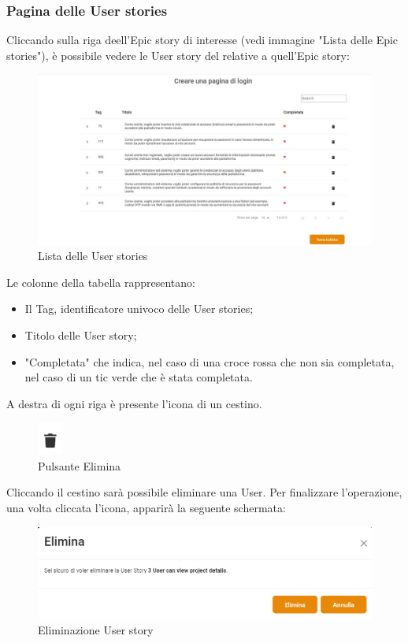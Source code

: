 \documentclass{article}
\begin{document}
\subsubsection{Pagina delle User stories}
Cliccando sulla riga deell'Epic story di interesse (vedi immagine "Lista delle Epic stories"), è possibile vedere le User story del relative a quell'Epic story:
    \begin{figure}[H]
      \centering
      \includegraphics[width=\textwidth]{documenti/Screenshot manuale utente/us pm dev.jpeg}
      \caption{Lista delle User stories}
      \label{lista user}
    \end{figure}
Le colonne della tabella rappresentano: 
\begin{itemize}
    \item Il Tag, identificatore univoco delle User stories;
    \item Titolo delle User story;
    \item "Completata" che indica, nel caso di una croce rossa che non sia completata, nel caso di un tic verde che è stata completata.
\end{itemize}
A destra di ogni riga è presente l'icona di un cestino.
    \begin{figure}[H]
      \centering
      \includegraphics{documenti/Screenshot manuale utente/cestino.png}
      \caption{Pulsante Elimina}
      \label{delete}
    \end{figure} 
    Cliccando il cestino sarà possibile eliminare una User. Per finalizzare l'operazione, una volta cliccata l'icona, apparirà la seguente schermata: 
        \begin{figure}[H]
      \centering
      \includegraphics[width=\textwidth]{documenti/Screenshot manuale utente/delete us.png}
      \caption{Eliminazione User story}
      \label{deleteuser}
    \end{figure} 
\end{document}
